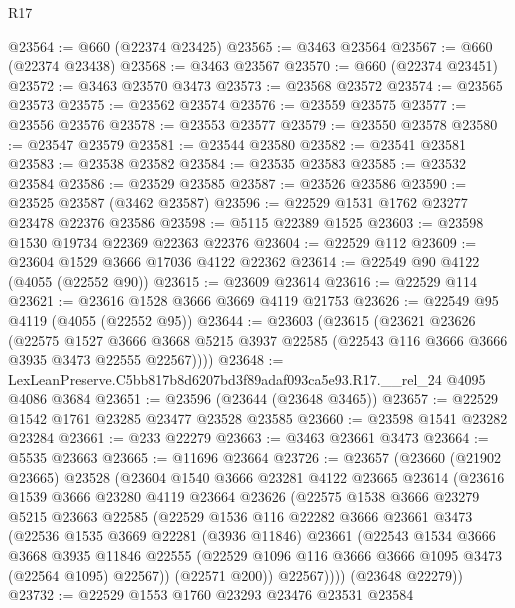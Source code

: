 \begin{lexlean}{R17}
\begin{coremodule}
@23564 := @660 (@22374 @23425)
@23565 := @3463 @23564
@23567 := @660 (@22374 @23438)
@23568 := @3463 @23567
@23570 := @660 (@22374 @23451)
@23572 := @3463 @23570 @3473
@23573 := @23568 @23572
@23574 := @23565 @23573
@23575 := @23562 @23574
@23576 := @23559 @23575
@23577 := @23556 @23576
@23578 := @23553 @23577
@23579 := @23550 @23578
@23580 := @23547 @23579
@23581 := @23544 @23580
@23582 := @23541 @23581
@23583 := @23538 @23582
@23584 := @23535 @23583
@23585 := @23532 @23584
@23586 := @23529 @23585
@23587 := @23526 @23586
@23590 := @23525 @23587 (@3462 @23587)
@23596 := @22529 @1531 @1762 @23277 @23478 @22376 @23586
@23598 := @5115 @22389 @1525
@23603 := @23598 @1530 @19734 @22369 @22363 @22376
@23604 := @22529 @112
@23609 := @23604 @1529 @3666 @17036 @4122 @22362
@23614 := @22549 @90 @4122 (@4055 (@22552 @90))
@23615 := @23609 @23614
@23616 := @22529 @114
@23621 := @23616 @1528 @3666 @3669 @4119 @21753
@23626 := @22549 @95 @4119 (@4055 (@22552 @95))
@23644 := @23603
    (@23615
      (@23621
        @23626
        (@22575
          @1527
          @3666
          @3668
          @5215
          @3937
          @22585
          (@22543 @116 @3666 @3666 @3935 @3473 @22555 @22567))))
@23648 := LexLeanPreserve.C5bb817b8d6207bd3f89adaf093ca5e93.R17.__rel_24 @4095 @4086 @3684
@23651 := @23596 (@23644 (@23648 @3465))
@23657 := @22529 @1542 @1761 @23285 @23477 @23528 @23585
@23660 := @23598 @1541 @23282 @23284
@23661 := @233 @22279
@23663 := @3463 @23661 @3473
@23664 := @5535 @23663
@23665 := @11696 @23664
@23726 := @23657
    (@23660
      (@21902 @23665)
      @23528
      (@23604
        @1540
        @3666
        @23281
        @4122
        @23665
        @23614
        (@23616
          @1539
          @3666
          @23280
          @4119
          @23664
          @23626
          (@22575
            @1538
            @3666
            @23279
            @5215
            @23663
            @22585
            (@22529
              @1536
              @116
              @22282
              @3666
              @23661
              @3473
              (@22536
                @1535
                @3669
                @22281
                (@3936 @11846)
                @23661
                (@22543
                  @1534
                  @3666
                  @3668
                  @3935
                  @11846
                  @22555
                  (@22529 @1096 @116 @3666 @3666 @1095 @3473 (@22564 @1095) @22567))
                (@22571 @200))
              @22567))))
      (@23648 @22279))
@23732 := @22529 @1553 @1760 @23293 @23476 @23531 @23584

\end{coremodule}
\end{lexlean}
